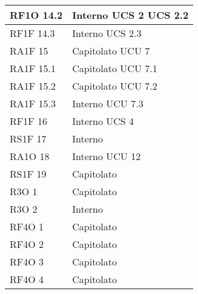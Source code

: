 \begin{center}
\begin{longtable}{ | p{5cm} | p{5cm} |}
        RF1O 14.2 &  Interno \newline  UCS 2 \newline  UCS 2.2 \newline  \\ \hline      
        RF1F 14.3 &  Interno \newline  UCS 2.3 \newline  \\ \hline      
        RA1F 15 &  Capitolato \newline  UCU 7 \newline  \\ \hline      
        RA1F 15.1 &  Capitolato \newline  UCU 7.1 \newline  \\ \hline      
        RA1F 15.2 &  Capitolato \newline  UCU 7.2 \newline  \\ \hline      
        RA1F 15.3 &  Interno \newline  UCU 7.3 \newline  \\ \hline      
        RF1F 16 &  Interno \newline  UCS 4 \newline  \\ \hline      
        RS1F 17 &  Interno \newline  \\ \hline      
        RA1O 18 &  Interno \newline  UCU 12 \newline  \\ \hline      
        RS1F 19 &  Capitolato \newline  \\ \hline      
        R3O 1 &  Capitolato \newline  \\ \hline      
        R3O 2 &  Interno \newline  \\ \hline      
        RF4O 1 &  Capitolato \newline  \\ \hline      
        RF4O 2 &  Capitolato \newline  \\ \hline      
        RF4O 3 &  Capitolato \newline  \\ \hline      
        RF4O 4 &  Capitolato \newline  \\ \hline      

\end{longtable}
\end{center}
